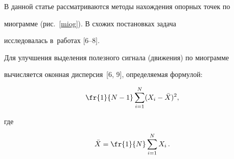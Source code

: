 В данной статье рассматриваются методы нахождения опорных точек по

миограмме (рис.~\ref{miog}). В схожих постановках задача

исследовалась в~работах [6--8].









Для улучшения выделения полезного сигнала (движения) по миограмме

вычисляется оконная дисперсия~[6, 9], определяемая формулой:

$$

\fr{1}{N-1} \sum\limits_{i=1}^N (X_i-\bar{X})^2 ,

$$

где

$$  

\bar{X} = \fr{1}{N} \sum\limits_{i=1}^N X_i\,. 

$$



